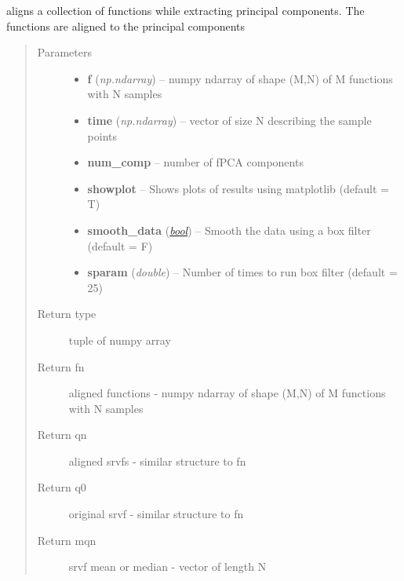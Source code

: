 \documentclass[letterpaper,10pt,english]{sphinxmanual}
\begin{document}
\begin{fulllineitems}
\label{time_warping:time_warping.align_fPCA}
aligns a collection of functions while extracting principal components. The functions are aligned to the principal
components
\begin{quote}\begin{description}
\item[{Parameters}] \leavevmode\begin{itemize}
\item {} 
\textbf{f} (\emph{np.ndarray}) -- numpy ndarray of shape (M,N) of M functions with N samples

\item {} 
\textbf{time} (\emph{np.ndarray}) -- vector of size N describing the sample points

\item {} 
\textbf{num\_comp} -- number of fPCA components

\item {} 
\textbf{showplot} -- Shows plots of results using matplotlib (default = T)

\item {} 
\textbf{smooth\_data} (\href{http://docs.python.org/library/functions.html\#bool}{\emph{bool}}) -- Smooth the data using a box filter (default = F)

\item {} 
\textbf{sparam} (\emph{double}) -- Number of times to run box filter (default = 25)

\end{itemize}

\item[{Return type}] \leavevmode
tuple of numpy array

\item[{Return fn}] \leavevmode
aligned functions - numpy ndarray of shape (M,N) of M functions with N samples

\item[{Return qn}] \leavevmode
aligned srvfs - similar structure to fn

\item[{Return q0}] \leavevmode
original srvf - similar structure to fn

\item[{Return mqn}] \leavevmode
srvf mean or median - vector of length N


\end{description}
\end{quote}
\end{fulllineitems}
\end{document}
